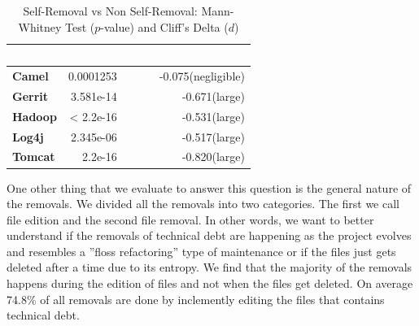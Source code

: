 \begin{table}[t]
	\begin{center}
		\caption{Self-Removal vs Non Self-Removal: Mann-Whitney Test ($p$-value) and Cliff's Delta ($d$) }
		\label{tbl:statistic}
		\begin{tabular}{l| rrr}
			\toprule
			\textbf{\thead{Project}} & \textbf{\thead{$p$-value}}&~~~ & \textbf{\thead{$d$}}\\ 
			\midrule
			\textbf{Camel }   &  0.0001253& ~~~ &  -0.075(negligible)  \\  
			\textbf{Gerrit}   &  3.581e-14& ~~~ &  -0.671(large)  \\  
			\textbf{Hadoop}   &  < 2.2e-16& ~~~ &  -0.531(large)  \\  
			\textbf{Log4j}   &  2.345e-06 & ~~~ &  -0.517(large)  \\  
			\textbf{Tomcat}   &  2.2e-16  & ~~~ &  -0.820(large) \\  
			\bottomrule
		\end{tabular}
	\end{center}    
\end{table}





One other thing that we evaluate to answer this question is the general nature of the removals. We divided all the removals into two categories. The first we call file edition and the second file removal. In other words, we want to better understand if the removals of technical debt are happening as the project evolves and resembles a ''floss refactoring'' type of maintenance or if the files just gets deleted after a time due to its entropy. We find that the majority of the removals happens during the edition of files and not when the files get deleted. On average 74.8\% of all removals are done by inclemently editing the files that contains technical debt. 





